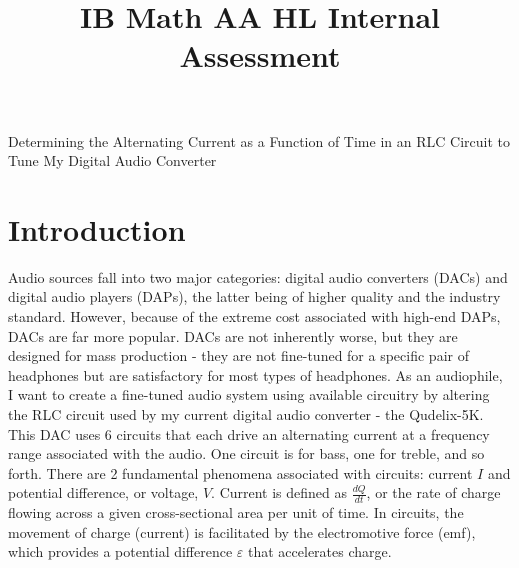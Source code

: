 \documentclass[12pt]{article}
\title{IB Math AA HL Internal Assessment}
\date{\vspace{-2cm}}
\numberwithin{equation}{section}
\begin{document}
\maketitle

{\LARGE{Determining the Alternating Current as a Function of Time in an RLC Circuit to Tune My Digital Audio Converter}}
\section{Introduction}
\noindent Audio sources fall into two major categories: digital audio converters (DACs) and digital audio players (DAPs), the latter being of higher quality and the industry standard. However, because of the extreme cost associated with high-end DAPs, DACs are far more popular. DACs are not inherently worse, but they are designed for mass production - they are not fine-tuned for a specific pair of headphones but are satisfactory for most types of headphones. As an audiophile, I want to create a fine-tuned audio system using available circuitry by altering the RLC circuit used by my current digital audio converter - the Qudelix-5K. This DAC uses 6 circuits that each drive an alternating current at a frequency range associated with the audio. One circuit is for bass, one for treble, and so forth. There are 2 fundamental phenomena associated with circuits: current $I$ and potential difference, or voltage, $V$. Current is defined as $\frac{dQ}{dt}$, or the rate of charge flowing across a given cross-sectional area per unit of time. In circuits, the movement of charge (current) is facilitated by the electromotive force (emf), which provides a potential difference $\varepsilon$ that accelerates charge. 
\FloatBarrier
\end{document}

